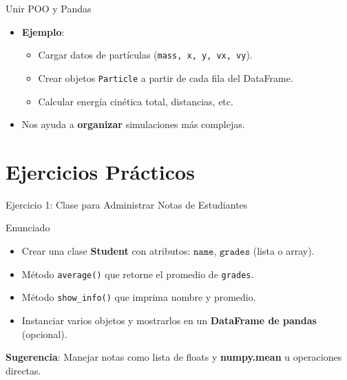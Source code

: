 \documentclass[10pt]{beamer}
\begin{document}
\begin{frame}{Unir POO y Pandas}
  \begin{itemize}
    \item \textbf{Ejemplo}:
      \begin{itemize}
        \item Cargar datos de partículas (\texttt{mass, x, y, vx, vy}).
        \item Crear objetos \texttt{Particle} a partir de cada fila del DataFrame.
        \item Calcular energía cinética total, distancias, etc.
      \end{itemize}
    \item Nos ayuda a \textbf{organizar} simulaciones más complejas.
  \end{itemize}
\end{frame}

\section{Ejercicios Prácticos}

\begin{frame}{Ejercicio 1: Clase para Administrar Notas de Estudiantes}
  \begin{block}{Enunciado}
    \begin{itemize}
      \item Crear una clase \textbf{Student} con atributos: \(\texttt{name}\), \(\texttt{grades}\) (lista o array).
      \item Método \texttt{average()} que retorne el promedio de \texttt{grades}.
      \item Método \texttt{show\_info()} que imprima nombre y promedio.
      \item Instanciar varios objetos y mostrarlos en un \textbf{DataFrame de pandas} (opcional).
    \end{itemize}
  \end{block}
  \textbf{Sugerencia}: Manejar notas como lista de floats y \textbf{numpy.mean} u operaciones directas.
\end{frame}
\end{document}
